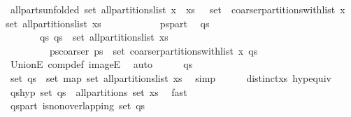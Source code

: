 \begin{isabellebody}
\ all{\isacharunderscore}parts{\isacharunderscore}unfolded{\isacharcolon}\ {\isachardoublequoteopen}set\ {\isacharparenleft}all{\isacharunderscore}partitions{\isacharunderscore}list\ {\isacharparenleft}x\ {\isacharhash}\ xs{\isacharparenright}{\isacharparenright}\ {\isacharequal}\ {\isasymUnion}\ {\isacharparenleft}{\isacharparenleft}set\ {\isasymcirc}\ {\isacharparenleft}coarser{\isacharunderscore}partitions{\isacharunderscore}with{\isacharunderscore}list\ x{\isacharparenright}{\isacharparenright}\ {\isacharbackquote}\ {\isacharparenleft}set\ {\isacharparenleft}all{\isacharunderscore}partitions{\isacharunderscore}list\ xs{\isacharparenright}{\isacharparenright}{\isacharparenright}{\isachardoublequoteclose}\ \isacommand{{\isachardot}}\isamarkupfalse%
\isanewline
\ \ \ \ \isanewline
\isanewline
\ \ \ \ \isamarkupfalse%
\ ps{\isacharunderscore}part\ \isamarkupfalse%
\ qs\isanewline
\ \ \ \ \ \ \ qs{\isacharcolon}\ {\isachardoublequoteopen}qs\ {\isasymin}\ set\ {\isacharparenleft}all{\isacharunderscore}partitions{\isacharunderscore}list\ xs{\isacharparenright}{\isachardoublequoteclose}\isanewline
\ \ \ \ \ \ \ \ \ ps{\isacharunderscore}coarser{\isacharcolon}\ {\isachardoublequoteopen}ps\ {\isasymin}\ set\ {\isacharparenleft}coarser{\isacharunderscore}partitions{\isacharunderscore}with{\isacharunderscore}list\ x\ qs{\isacharparenright}{\isachardoublequoteclose}\isanewline
\ \ \ \ \ \ \isamarkupfalse%
\ UnionE\ comp{\isacharunderscore}def\ imageE\ \isamarkupfalse%
\ auto\isanewline
\isanewline
\ \ \ \ \isamarkupfalse%
\ qs\ \isamarkupfalse%
\ {\isachardoublequoteopen}set\ qs\ {\isasymin}\ set\ {\isacharparenleft}map\ set\ {\isacharparenleft}all{\isacharunderscore}partitions{\isacharunderscore}list\ {\isacharparenleft}xs{\isacharparenright}{\isacharparenright}{\isacharparenright}{\isachardoublequoteclose}\ \isamarkupfalse%
\ simp\isanewline
\ \ \ \ \isamarkupfalse%
\ distinct{\isacharunderscore}xs\ hyp{\isacharunderscore}equiv\ \isamarkupfalse%
\ qs{\isacharunderscore}hyp{\isacharcolon}\ {\isachardoublequoteopen}set\ qs\ {\isasymin}\ all{\isacharunderscore}partitions\ {\isacharparenleft}set\ xs{\isacharparenright}{\isachardoublequoteclose}\ \isamarkupfalse%
\ fast\isanewline
\ \ \ \ \isamarkupfalse%
\ \isamarkupfalse%
\ qs{\isacharunderscore}part{\isacharcolon}\ {\isachardoublequoteopen}is{\isacharunderscore}non{\isacharunderscore}overlapping\ {\isacharparenleft}set\ qs{\isacharparenright}{\isachardoublequoteclose}\isanewline

\end{isabellebody}
